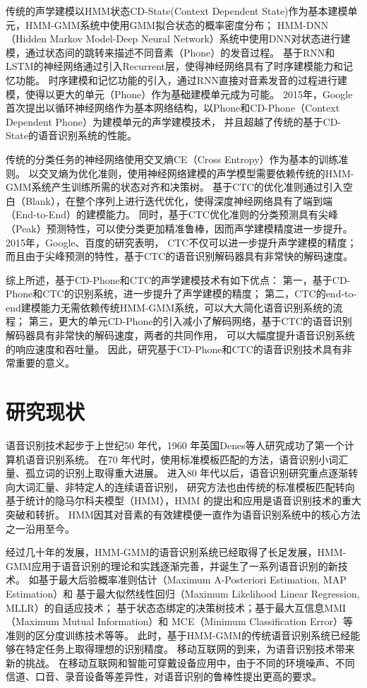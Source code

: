 传统的声学建模以HMM状态CD-State(Context Dependent State)作为基本建模单元，HMM-GMM系统中使用GMM拟合状态的概率密度分布；
HMM-DNN（Hidden Markov Model-Deep Neural Network）系统中使用DNN对状态进行建模，通过状态间的跳转来描述不同音素（Phone）的发音过程。
基于RNN和LSTM的神经网络通过引入Recurrent层，使得神经网络具有了时序建模能力和记忆功能。
时序建模和记忆功能的引入，通过RNN直接对音素发音的过程进行建模，使得以更大的单元（Phone）作为基础建模单元成为可能。
2015年，Google首次提出以循环神经网络作为基本网络结构，以Phone和CD-Phone（Context Dependent Phone）为建模单元的声学建模技术，
并且超越了传统的基于CD-State的语音识别系统的性能。

传统的分类任务的神经网络使用交叉熵CE（Cross Entropy）作为基本的训练准则。
以交叉熵为优化准则，使用神经网络建模的声学模型需要依赖传统的HMM-GMM系统产生训练所需的状态对齐和决策树。
基于CTC的优化准则通过引入空白（Blank），在整个序列上进行迭代优化，使得深度神经网络具有了端到端（End-to-End）的建模能力。
同时，基于CTC优化准则的分类预测具有尖峰（Peak）预测特性，可以使分类更加精准鲁棒，因而声学建模精度进一步提升。
2015年，Google、百度的研究表明，
CTC不仅可以进一步提升声学建模的精度；而且由于尖峰预测的特性，基于CTC的语音识别解码器具有非常快的解码速度。

综上所述，基于CD-Phone和CTC的声学建模技术有如下优点：
第一，基于CD-Phone和CTC的识别系统，进一步提升了声学建模的精度；
第二，CTC的end-to-end建模能力无需依赖传统HMM-GMM系统，可以大大简化语音识别系统的流程；
第三，更大的单元CD-Phone的引入减小了解码网络，基于CTC的语音识别解码器具有非常快的解码速度，两者的共同作用，
可以大幅度提升语音识别系统的响应速度和吞吐量。
因此，研究基于CD-Phone和CTC的语音识别技术具有非常重要的意义。

\section{研究现状}

语音识别技术起步于上世纪50 年代，1960 年英国Denes等人研究成功了第一个计算机语音识别系统。
在70 年代时，使用标准模板匹配的方法，语音识别小词汇量、孤立词的识别上取得重大进展。
进入80 年代以后，语音识别研究重点逐渐转向大词汇量、非特定人的连续语音识别，
研究方法也由传统的标准模板匹配转向基于统计的隐马尔科夫模型（HMM），HMM 的提出和应用是语音识别技术的重大突破和转折。
HMM因其对音素的有效建模便一直作为语音识别系统中的核心方法之一沿用至今。

经过几十年的发展，HMM-GMM的语音识别系统已经取得了长足发展，HMM-GMM应用于语音识别的理论和实践逐渐完善，并诞生了一系列语音识别的新技术。
如基于最大后验概率准则估计（Maximum A-Posteriori Estimation, MAP Estimation）和
基于最大似然线性回归（Maximum Likelihood Linear Regression, MLLR）的自适应技术；
基于状态态绑定的决策树技术；基于最大互信息MMI（Maximum Mutual Information）和
MCE（Minimum Classification Error）等准则的区分度训练技术等等。
此时，基于HMM-GMM的传统语音识别系统已经能够在特定任务上取得理想的识别精度。
移动互联网的到来，为语音识别技术带来新的挑战。
在移动互联网和智能可穿戴设备应用中，由于不同的环境噪声、不同信道、口音、录音设备等差异性，对语音识别的鲁棒性提出更高的要求。

